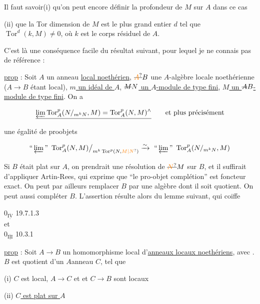 Il faut savoir\quad (i) qu'on peut encore définir la profondeur de $M$ sur $A$ dans ce cas

(ii) que la Tor dimension de $M$ est le plus grand entier $d$ tel que $\operatorname{Tor}^d(k,M)\ne0$, où $k$ est le corps résiduel de $A$.

C'est là une conséquence facile du résultat suivant, pour lequel je ne connais pas de référence :

\uline{prop} : Soit $A$ un anneau \uline{local noethérien}, $\deleted{\unsure{A}}B$ une $A$-algèbre locale noethérienne ($A\longrightarrow B$ étant local), \uline{$m$ un idéal de $A$}, \uline{$\deleted{M}N$ un $A$-module de type fini}, \uline{$M$ un $\deleted{A}B$-module de type fini}. On a

\[
\underline{\varprojlim\operatorname{Tor}^{p}_{A}(N/_{m^kN},M)=
\operatorname{Tor}^{p}_{A}(N,M)^{\wedge}}\qquad\text{et plus précisément}
\]

une égalité de proobjets

\[
\text{``}\varprojlim\text{''}\ \operatorname{Tor}^{p}_{A}(N,M)\big/_{m^k\operatorname{Tor}^{p}(N,\unsure{M|N})}
\xrightarrow{\sim}\ \text{``}\varprojlim\text{''}\ \operatorname{Tor}^{p}_{A}(N/_{m^kN},M)
\]

Si $B$ était plat sur $A$, on prendrait une résolution de $\deleted{\unsure{N}}M$ sur $B$, et il suffirait d'appliquer Artin-Rees, qui exprime que ``le pro-objet complétion'' est foncteur exact. On peut par ailleurs remplacer $B$ par une algèbre dont il soit quotient. On peut aussi compléter $B$. L'assertion résulte alors du lemme suivant, qui coiffe

$0_{\overline{\underline{\mathrm{IV}}}}$ 19.7.1.3\\
et\\
$0_{\overline{\underline{\mathrm{III}}}}$ 10.3.1

\uline{prop} : Soit $A\longrightarrow B$ un homomorphisme local d'\uline{anneaux locaux noethériens}, avec . $B$ est quotient d'un $A$anneau $C$, tel que


(i) $C$ est local, $A\longrightarrow C$ et et $C\longrightarrow B$ sont locaux

(ii) \uline{$C$ est plat sur $A$}

